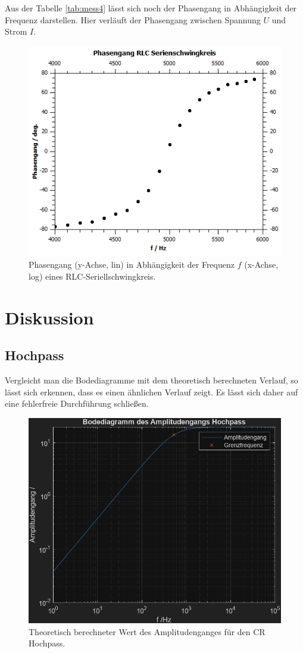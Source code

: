 \documentclass[12pt,a4paper,twoside]{article}
\begin{document}
\noindent
Aus der Tabelle \ref{tab:mess4} lässt sich noch der Phasengang in Abhängigkeit der Frequenz darstellen. 
Hier verläuft der Phasengang zwischen Spannung $U$ und Strom $I$. 

\begin{figure}[H]
    \centering
    \includegraphics[width=0.6\linewidth]{nudes/Plot a4 ph.jpg}
    \caption{Phasengang (y-Achse, lin) in Abhängigkeit der Frequenz $f$ (x-Achse, log) eines RLC-Seriellschwingkreis. }
    \label{fig:plot a4 ph} 
\end{figure}

\section{Diskussion} %
\subsection{Hochpass}
Vergleicht man die Bodediagramme mit dem theoretisch berechneten Verlauf, so lässt sich erkennen, dass es einen ähnlichen Verlauf zeigt. 
Es lässt sich daher auf eine fehlerfreie Durchführung schließen. 

\begin{figure}[H]
    \centering
    \includegraphics[width=0.6\linewidth]{Matlab/1 amp.png}
    \caption{Theoretisch berechneter Wert des Amplitudenganges für den CR Hochpass.}
    \label{fig:disk 1 amp} 
\end{figure}
\end{document}
